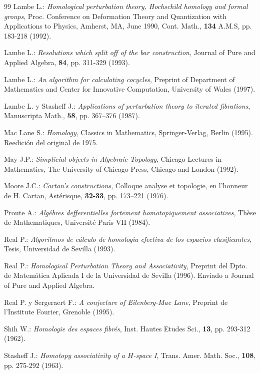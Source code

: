 \begin{thebibliography}{99}
 Lambe L.: {\em Homological perturbation theory,
Hochschild homology and formal groups}, Proc. Conference on Deformation
Theory and Quantization with Applications to Physics, Amherst, MA, June
1990, Cont. Math., {\bf 134} A.M.S, pp. 183-218 (1992).

 Lambe L.: {\em
Resolutions which split off of the bar
construction}, Journal of Pure and Applied Algebra, {\bf 84}, pp.
311-329 (1993).

 Lambe L.: {\em An algorithm for calculating cocycles},
Preprint of Department of Mathematics and Center for
Innovative Computation, University of Wales (1997).

 Lambe  L. y Stasheff J.: {\em Applications of
perturbation theory to iterated fibrations}, Manuscripta Math.,
{\bf 58}, pp. 367--376 (1987).

 Mac Lane S.: {\em Homology}, Classics in
Mathematics, Springer-Verlag, Berlin (1995). Reedici\'{o}n del original
de 1975.

 May J.P.: {\em Simplicial objects in Algebraic Topology},
Chicago Lectures in Mathematics, The University of Chicago
Press, Chicago and London (1992).

 Moore J.C.: {\em Cartan's constructions}, Colloque
analyse et topologie, en l'honneur de H. Cartan, Ast\'{e}risque,
{\bf 32-33}, pp. 173--221 (1976).

 Proute A.: {\em
Alg\'{e}bres defferentielles fortement homotopiquement associatives},
 Th\`{e}se de Mathematiques, Universit\'{e} Paris VII (1984).

 Real P.: {\em Algoritmos de c\'{a}lculo de
homolog\'{\i}a efectiva de los espacios clasificantes}, Tesis,
Universidad de Sevilla (1993).

 Real P.: {\em Homological Perturbation
Theory and Associativity}, Preprint del Dpto. de Matem\'{a}tica
Aplicada I de la Universidad de Sevilla (1996). Enviado a Journal
of Pure and Applied Algebra.

 Real P. y Sergeraert F.: {\em A conjecture of
Eilenberg-Mac Lane}, Preprint de l'Institute Fourier, Grenoble
(1995).

 Shih W.: {\em Homologie des espaces fibr\'{e}s}, Inst.
Hautes Etudes Sci., {\bf 13}, pp. 293-312 (1962).

 Stasheff J.: {\em Homotopy associativity of a $H$-space
I}, Trans. Amer. Math. Soc., {\bf 108}, pp. 275-292 (1963).


\end{thebibliography}
